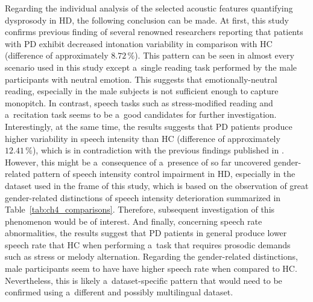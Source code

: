Regarding the individual analysis of the selected acoustic features quantifying dysprosody in HD, the following conclusion can be made. At first, this study confirms previous finding of several renowned researchers \cite{Canter1965, Metter1986, Flint1992, Goberman2005b, Skodda2011c} reporting that patients with PD exhibit decreased intonation variability in comparison with HC (difference of approximately $8.72\,\%$). This pattern can be seen in almost every scenario used in this study except a~single reading task performed by the male participants with neutral emotion. This suggests that emotionally-neutral reading, especially in the male subjects is not sufficient enough to capture monopitch. In contrast, speech tasks such as stress-modified reading and a~recitation task seems to be a~good candidates for further investigation. Interestingly, at the same time, the results suggests that PD patients produce higher variability in speech intensity than HC (difference of approximately $12.41\,\%$), which is in contradiction with the previous findings published in \cite{Metter1986, Watson2008, Rusz2011, Skodda2011c}. However, this might be a~consequence of a~presence of so far uncovered gender-related pattern of speech intensity control impairment in HD, especially in the dataset used in the frame of this study, which is based on the observation of great gender-related distinctions of speech intensity deterioration summarized in Table~\ref{tab:ch4_comparisons}. Therefore, subsequent investigation of this phenomenon would be of interest. And finally, concerning speech rate abnormalities, the results suggest that PD patients in general produce lower speech rate that HC when performing a~task that requires prosodic demands such as stress or melody alternation. Regarding the gender-related distinctions, male participants seem to have have higher speech rate when compared to HC. Nevertheless, this is likely a~dataset-specific pattern that would need to be confirmed using a~different and possibly multilingual dataset.

